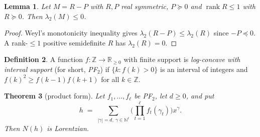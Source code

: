 \documentclass[11pt]{article}
\newtheorem{theorem}{Theorem}
\newtheorem{lemma}[theorem]{Lemma}
\theoremstyle{definition}
\newtheorem{definition}[theorem]{Definition}
\newcommand{\Z}{\mathbb{Z}}
\newcommand{\N}{\mathbb{N}}
\newcommand{\R}{\mathbb{R}}
\begin{document}
\begin{lemma}\label{lem:weyl}
Let $M=R-P$ with $R,P$ real symmetric, $P\succeq 0$ and $\operatorname{rank}R\le1$ with
$R\succeq0$. Then $\lambda_2(M)\le0$.
\end{lemma}

\begin{proof}
Weyl's monotonicity inequality gives $\lambda_2(R-P)\le\lambda_2(R)$ since $-P\preceq0$.
A rank-$\le1$ positive semidefinite $R$ has $\lambda_2(R)=0$.
\end{proof}

\begin{definition}\label{def:lc}
A function $f:\Z\to\R_{\ge0}$ with finite support is \emph{log-concave with interval support}
(for short, \emph{PF$_2$}) if $\{k:f(k)>0\}$ is an interval of integers and
$f(k)^2\ge f(k-1)f(k+1)$ for all $k\in\Z$.
\end{definition}

\begin{theorem}[product form]\label{thm:product}
Let $f_1,\dots,f_\ell$ be PF$_2$, let $d\ge0$, and put
\[
  h\;=\;\sum_{|\gamma|=d,\ \gamma\in\N^\ell}\Big(\prod_{t=1}^{\ell}f_t(\gamma_t)\Big)x^\gamma .
\]
Then $N(h)$ is Lorentzian.
\end{theorem}
\end{document}
